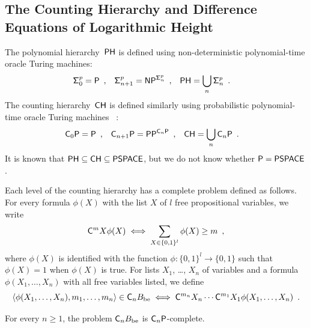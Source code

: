 \subsection{The Counting Hierarchy and Difference Equations of Logarithmic Height}
\label{subsection: counting hierarchy}

The polynomial hierarchy~$\mathsf{PH}$ is defined using non-deterministic polynomial-time oracle Turing machines: 
\begin{align}
 \mathsf{\Sigma}^p_0  &= \mathsf{P} \enspace ,
 &
 \mathsf{\Sigma}^p_{n+1} &= \mathsf{NP} ^{\mathsf{\Sigma}^p_n} \enspace ,
 &
 \mathsf{PH} &= \bigcup_n \mathsf{\Sigma}^p_n \enspace .
\end{align}
The counting hierarchy~$\mathsf{CH}$
is defined similarly
using probabilistic polynomial-time oracle Turing machines~%
\cite{wagner1986complexity,toran1991complexity}: 
\begin{align} \label{eq:CH}
 \mathsf{C}_0 \mathsf{P}  &= \mathsf{P} \enspace ,
 &
 \mathsf{C}_{n+1} \mathsf{P} &= \mathsf{PP}^{\mathsf{C}_n \mathsf{P}} \enspace ,
 &
 \mathsf{CH} &= \bigcup_n \mathsf{C}_n \mathsf{P} \enspace .
\end{align}
It is known that $\mathsf{PH} \subseteq \mathsf{CH} \subseteq \mathsf{PSPACE}$, 
but we do not know whether $\mathsf{P} = \mathsf{PSPACE}$.

Each level of the counting hierarchy 
has a complete problem defined as follows.
For every formula $\phi(X)$ with the list $X$ of $l$ free propositional variables,
we write 
\begin{equation}
 \mathsf{C}^m X \phi(X) 
  \iff 
  \sum_{X \in \{0,1\}^l} \phi(X) \ge m \enspace ,
\end{equation}
where $\phi(X)$ is identified with the function 
$\phi \colon \{0,1\}^l \to \{0,1\}$
such that $\phi(X) = 1$ when $\phi(X)$ is true.
For lists $X _1$, \ldots, $X _n$ of variables 
and a formula $\phi(X_1, \dots, X_n)$ with all free variables listed, 
we define
\begin{equation}
 \langle \phi(X_1, \dots, X_n), m_1, \dots, m_n \rangle \in \mathsf{C}_n B_{\mathrm{be}}
 \iff
 \mathsf{C}^{m_n}{X_n} \cdots \mathsf{C}^{m_1}{X_1} \phi(X_1, \dots, X_n) \enspace .
\end{equation}

\begin{lemma} \label{lemma:CnP-complete}
 For every $n \ge 1$, 
 the problem $\mathsf{C}_n B_{\mathrm{be}}$ is $\mathsf{C}_n\mathsf{P}$-complete.
\end{lemma}

